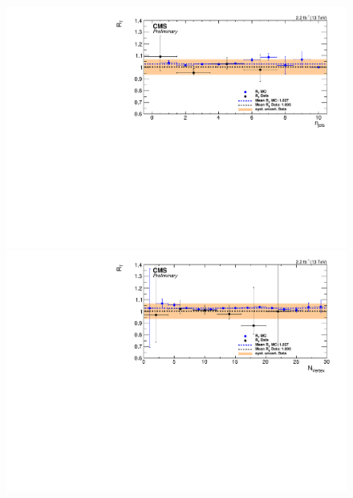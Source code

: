 \begin{figure}[htbp]
  \centering
  \begin{minipage}[t]{0.3\textwidth}
    \includegraphics[width=\textwidth]{bkgd/figs/Triggereff_SFvsOF_Syst_PFHT_HighHTExclusiveCentral_Run2015_25ns_NJets_None_NonIso_MC.pdf}
  \end{minipage}
  \begin{minipage}[t]{0.3\textwidth}
    \includegraphics[width=\textwidth]{bkgd/figs/Triggereff_SFvsOF_Syst_PFHT_HighHTExclusiveCentral_Run2015_25ns_nVtx_None_NonIso_MC.pdf}
  \end{minipage}
  \begin{minipage}[t]{0.3\textwidth}

\end{minipage}
\end{figure}
